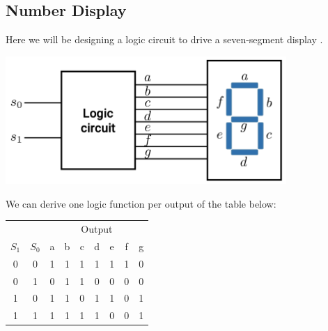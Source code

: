 \documentclass[12pt,openany, tikz,border=10pt]{book}
\begin{document}
			      	\subsection{Number Display}
			      	Here we will be designing a logic circuit to drive a seven-segment display .
			      	\begin{center}
			      		\begin{minipage}[c]{0.80\textwidth} %
			      			\centering
			      			\includegraphics[width=0.80\textwidth]{circuits/6.12.1.png} 
			      		\end{minipage}
			      	\end{center}
			      	We can derive one logic function per output of the table below:
			      	\begin{table}[h!]
			      		\centering
			      		\begin{tabular}{|c|c|c|c|c|c|c|c|c|}
			      			\hline
			      			\multicolumn{2}{|c|}{} & \multicolumn{7}{c|}{Output} \\
			      			\hhline{|~|-|-------|}
			      			\( S_1 \) & \( S_0 \) & a & b & c & d & e & f & g \\
			      			\hline
			      			0         & 0         & 1 & 1 & 1 & 1 & 1 & 1 & 0 \\
			      			\hline
			      			0         & 1         & 0 & 1 & 1 & 0 & 0 & 0 & 0 \\
			      			\hline
			      			1         & 0         & 1 & 1 & 0 & 1 & 1 & 0 & 1 \\
			      			\hline
			      			1         & 1         & 1 & 1 & 1 & 1 & 0 & 0 & 1 \\
			      			\hline
			      		\end{tabular}
			      	\end{table}
			      	\vspace{-10px}
\end{document}
